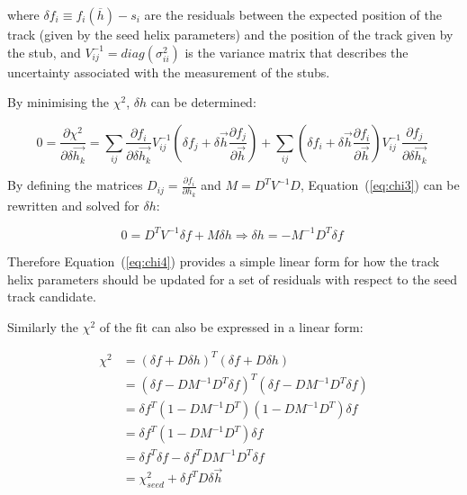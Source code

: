 where $\delta f_{i} \equiv f_{i}(\overline{h}) - s_{i}$ are the residuals between the expected position of the track (given by the seed helix parameters) and the position of the track given by the stub, and $V^{-1}_{ij} = diag(\sigma^{2}_{ii})$ is the variance matrix that describes the uncertainty associated with the measurement of the stubs.

By minimising the $\chi^{2}$, $\delta h$ can be determined:

\begin{equation}
0 = \frac{\partial \chi^{2}}{\partial \delta \overrightarrow{h_{k}}} = \sum_{ij} \frac{\partial f_{i}}{\partial \delta \overrightarrow{h_{k}}} V^{-1}_{ij} ( \delta f_{j} + \delta \overrightarrow{h} \frac{\partial f_{j}}{\partial \overrightarrow{h}} ) + \sum_{ij}	( \delta f_{i} + \delta \overrightarrow{h} \frac{\partial f_{i}}{\partial \overrightarrow{h}} ) V^{-1}_{ij} \frac{\partial f_{j}}{\partial \delta \overrightarrow{h_{k}}}  \;
\label{eq:chi3}
\end{equation}

By defining the matrices $D_{ij} = \frac{\partial f_{i}}{\partial h_{k}}$ and $M = D^{T} V^{-1} D$, Equation~(\ref{eq:chi3}) can be rewritten and solved for $\delta h$:

\begin{equation}
0 = D^{T} V^{-1} \delta f + M \delta h \Rightarrow \delta h = - M^{-1} D^{T} \delta f \;
\label{eq:chi4}
\end{equation}

Therefore Equation~(\ref{eq:chi4}) provides a simple linear form for how the track helix parameters should be updated for a set of residuals with respect to the seed track candidate.

Similarly the $\chi^{2}$ of the fit can also be expressed in a linear form:

\begin{equation}
\begin{split}
\chi^{2} &= (\delta f + D \delta h)^{T}(\delta f + D \delta h) \\
         &= (\delta f - DM^{-1}D^{T}\delta f)^{T} (\delta f - DM^{-1}D^{T}\delta f) \\
         &= \delta f^{T} (1- DM^{-1}D^{T}) (1- DM^{-1}D^{T}) \delta f \\
         &= \delta f^{T} (1- DM^{-1}D^{T}) \delta f \\
         &= \delta f^{T} \delta f - \delta f^{T} DM^{-1}D^{T} \delta f \\
         &= \chi^{2}_{seed} + \delta f^{T} D \delta \overrightarrow{h} 
\end{split}
\label{eq:chi5}
\end{equation}

